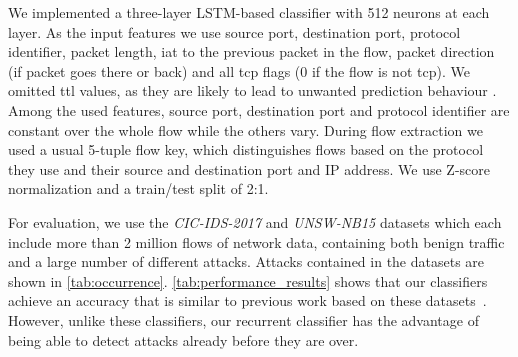 \documentclass[conference]{IEEEtran}
\begin{document}
We implemented a three-layer LSTM-based classifier with 512 neurons at each layer. As the input features we use
source port, destination port, protocol identifier, packet length, \gls{iat} to the previous packet in the flow, packet direction (if packet goes there or back) and all \gls{tcp} flags (0 if the flow is not \gls{tcp}).
We omitted \gls{ttl} values, as they are likely to lead to unwanted prediction behaviour \cite{bachl_walling_2019}.  Among the used features, source port, destination port and protocol identifier are constant over the whole flow while the others vary.
During flow extraction we used a usual 5-tuple flow key, which distinguishes flows based on the protocol they use and their source and destination port and IP address.
We use Z-score normalization and a train/test split of 2:1.

For evaluation, we use the \textit{CIC-IDS-2017} \cite{sharafaldin_toward_2018} and \textit{UNSW-NB15} \cite{moustafa_unsw-nb15:_2015} datasets which each include more than 2 million flows of network data, containing both benign traffic and a large number of different attacks. Attacks contained in the datasets are shown in \autoref{tab:occurrence}.
\autoref{tab:performance_results} shows that our classifiers achieve an accuracy that is similar to previous work based on these datasets~\cite{meghdouri_analysis_2018,bachl_walling_2019}. However, unlike these classifiers, our recurrent classifier has the advantage of being able to detect attacks already before they are over.
\end{document}
